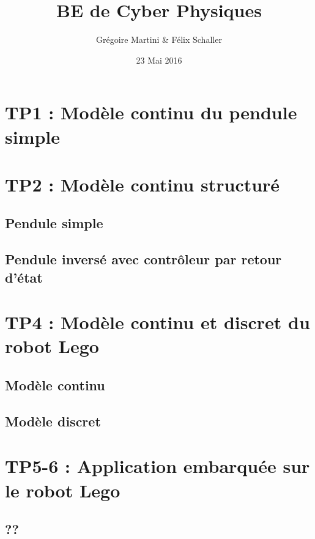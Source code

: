 \documentclass[a4paper,12pt]{article}
\title{BE de Cyber Physiques}
\author{Grégoire Martini \& Félix Schaller }
\date{23 Mai 2016}
\begin{document}
\maketitle

\bigskip
\bigskip
\bigskip
\tableofcontents
\newpage


\section{TP1 : Modèle continu du pendule simple}

\clearpage
\section{TP2 : Modèle continu structuré}
\subsection{Pendule simple}
\subsection{Pendule inversé avec contrôleur par retour d'état}

\clearpage
\section{TP4 : Modèle continu et discret du robot Lego}
\subsection{Modèle continu}
\subsection{Modèle discret}


\clearpage
\section{TP5-6 : Application embarquée sur le robot Lego}
\subsection{??}
\end{document}
